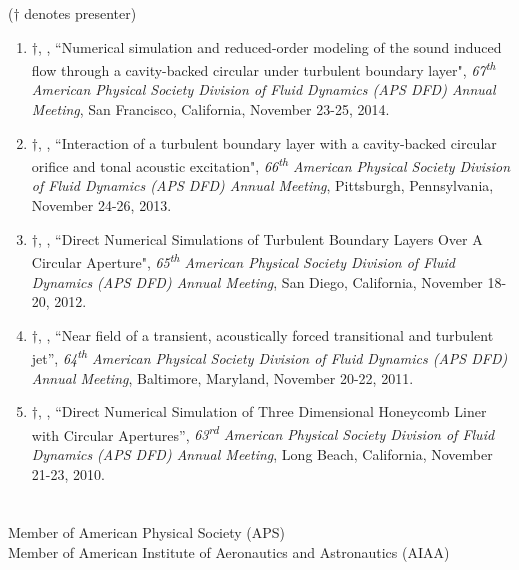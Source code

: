 \documentclass[11pt,letter]{article}
\begin{document}
\begin{adjustwidth}{1em}{0pt}
($\dag$ denotes presenter)
\begin{enumerate}
\item \QZ$\dag$, \DJB, ``{Numerical simulation and reduced-order modeling of the sound induced flow through a cavity-backed circular under turbulent boundary layer}",  \emph{67\textsuperscript{th} American Physical Society Division of Fluid Dynamics (APS DFD) Annual Meeting}, San Francisco, California, November 23-25, 2014.
\item \QZ$\dag$, \DJB, ``{Interaction of a turbulent boundary layer with a cavity-backed circular orifice and tonal acoustic excitation}",  \emph{66\textsuperscript{th} American Physical Society Division of Fluid Dynamics (APS DFD) Annual Meeting}, Pittsburgh, Pennsylvania, November 24-26, 2013.
\item \QZ$\dag$, \DJB, ``{Direct Numerical Simulations of Turbulent Boundary Layers Over A Circular Aperture}",  \emph{65\textsuperscript{th} American Physical Society Division of Fluid
Dynamics (APS DFD) Annual Meeting}, San Diego, California, November 18-20, 2012.
\item \QZ$\dag$, \DJB, ``{Near field of a transient, acoustically forced transitional and turbulent jet''}, \emph{64\textsuperscript{th} American Physical Society Division of Fluid
Dynamics (APS DFD) Annual Meeting}, Baltimore, Maryland, November 20-22, 2011.
\item \QZ$\dag$, \DJB, {``Direct Numerical Simulation of Three Dimensional Honeycomb Liner with Circular Apertures''}, \emph{63\textsuperscript{rd} American Physical Society Division of Fluid
Dynamics (APS DFD) Annual Meeting}, Long Beach, California, November 21-23, 2010.
\end{enumerate}
\end{adjustwidth}

\section*{}
\begin{adjustwidth}{2em}{0pt}
Member of American Physical Society (APS)\\ %
Member of American Institute of Aeronautics and Astronautics (AIAA) %
\end{adjustwidth}
\end{document}
